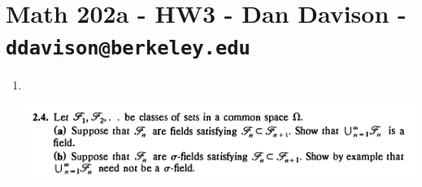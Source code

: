 \section*{Math 202a - HW3 - Dan Davison - \texttt{ddavison@berkeley.edu}}

\begin{enumerate}
\item~\\
  \begin{mdframed}
    \includegraphics[width=400pt]{img/analysis--berkeley-202a-hw-e32d.png}
  \end{mdframed}


\end{enumerate}
